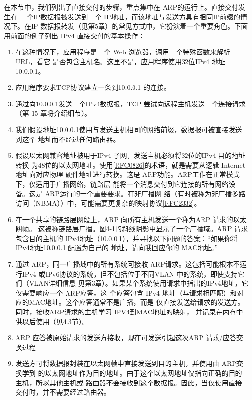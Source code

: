 在本节中，我们列出了直接交付的步骤，重点集中在 ARP的运行上。直接交付发生在
一个IP数据报被发送到一个 IP地址，而该地址与发送方具有相同IP前缀的情况下。在IP
数据报转发（见第5章）的常见方式中，它扮演着一个重要角色。下面用前面的例子列出
IPv4 直接交付的基本操作：
\begin{enumerate}
  \item 在这种情况下，应用程序是一个 Web 浏览器，调用一个特殊函数来解析 URL，看它
    是否包含主机名。这里不是，应用程序使用32位IPv4 地址 10.0.0.1。

  \item 应用程序要求TCP协议建立一条到10.0.0.1 的连接。

  \item 通过向10.0.0.1发送一个IPv4数据报，TCP 尝试向远程主机发送一个连接请求（第
    15 章将介绍细节）。

  \item 我们假设地址10.0.0.1使用与发送主机相同的网络前缀，数据报可被直接发送到这个
    地址而不经过任何路由器。

  \item 假设以太网兼容地址被用于IPv4 子网，发送主机必须将32位的IPv4 目的地址转换
    为48位的以太网地址。使用\href{https://www.rfc-editor.org/rfc/rfc0826}{[RFC0826]}的术语，就是需要从逻辑
    Internet 地址向对应物理
    硬件地址进行转换。这是 ARP功能。ARP工作在正常模式下，仅适用于广播网络，链路层
    能将一个消息交付到它连接的所有网络设备。这是 ARP运行的一个重要要求。在非广播网
    络（有时被称为非广播多路访问（NBMA））中，可能需要更复杂的映射协议\href{https://www.rfc-editor.org/rfc/rfc2332}{[RFC2332]}。

  \item 在一个共享的链路层网段上，ARP 向所有主机发送一个称为ARP 请求的以太网帧。
    这被称链路层广播。图4-1的斜线阴影中显示了一个广播域。ARP 请求包含目的主机的
    IPv4地址（10.0.0.1），并寻找以下问题的答案：“如果你将IPv4地址10.0.0.1 配置为自己的
    地址，请向我回应你的 MAC地址。”

  \item 通过 ARP，同一广播域中的所有系统可接收 ARP请求。这包括可能根本不运行IPv4
    或IPv6协议的系统，但不包括位于不同VLAN 中的系统，即使支持它们（VLAN详细信息
    见第3章）。如果某个系统使用请求中指出的IPv4地址，它仅需要响应一个 ARP应答。这
    个应答包含 IPv4 地址（与请求相匹配）和对应的MAC地址。这个应答通常不是广播，而是
    仅直接发送给请求的发送方。同时，接收ARP请求的主机学习 IPV4到MAC地址的映射，
    并记录在内存中供以后使用（见4.3节）。

  \item ARP 应答被原始请求的发送方接收，现在可发送引起这次ARP 请求/应答交换过程

  \item 发送方可将数据报封装在以太网帧中直接发送到目的主机，并使用由 ARP交换学到
    的以太网地址作为目的地址。由于这个以太网地址仅指向正确的目的主机，所以其他主机或
    路由器不会接收到这个数据报。因此，当仅使用直接交付时，并不需要经过路由器。
\end{enumerate}


